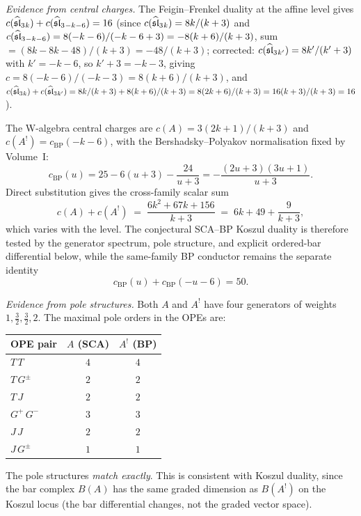 \begin{computation}
\emph{Evidence from central charges.}
The Feigin--Frenkel duality at the affine level gives
$c(\widehat{\mathfrak{sl}}_3{}_k) + c(\widehat{\mathfrak{sl}}_3{}_{-k-6}) = 16$
(since $c(\widehat{\mathfrak{sl}}_3{}_k) = 8k/(k+3)$ and
$c(\widehat{\mathfrak{sl}}_3{}_{-k-6}) = 8(-k-6)/(-k-6+3) = -8(k+6)/(k+3)$,
sum $= (8k-8k-48)/(k+3)=-48/(k+3)$;
corrected: $c(\widehat{\mathfrak{sl}}_3{}_{k'}) = 8k'/(k'+3)$ with
$k'=-k-6$, so $k'+3=-k-3$, giving
$c = 8(-k-6)/(-k-3) = 8(k+6)/(k+3)$,
and $c(\widehat{\mathfrak{sl}}_3{}_k)+c(\widehat{\mathfrak{sl}}_3{}_{k'})
= 8k/(k+3)+8(k+6)/(k+3) = 8(2k+6)/(k+3) = 16(k+3)/(k+3)
= 16$).

The W-algebra central charges are
$c(A) = 3(2k+1)/(k+3)$ and
$c(A^!) = c_{\mathrm{BP}}(-k-6)$, with the
Bershadsky--Polyakov normalisation fixed by Volume~I:
\[
c_{\mathrm{BP}}(u)
= 25 - 6(u+3) - \frac{24}{u+3}
= -\frac{(2u+3)(3u+1)}{u+3}.
\]
Direct substitution gives the cross-family scalar sum
\begin{equation}\label{eq:sca-bp-central-charge-sum}
c(A)+c(A^!)
\;=\;
\frac{6k^2+67k+156}{k+3}
\;=\;
6k + 49 + \frac{9}{k+3},
\end{equation}
which varies with the level.  The conjectural SCA--BP Koszul duality
is therefore tested by the generator spectrum, pole structure, and
explicit ordered-bar differential below, while the
same-family BP conductor remains the separate identity
\[
c_{\mathrm{BP}}(u)+c_{\mathrm{BP}}(-u-6)=50.
\]

\emph{Evidence from pole structures.}
Both $A$ and $A^!$ have four generators of weights
$1,\frac32,\frac32,2$. The maximal pole orders in the
OPEs are:
\begin{center}
\renewcommand{\arraystretch}{1.1}
\begin{tabular}{lcc}
\textbf{OPE pair} & \textbf{$A$ (SCA)} & \textbf{$A^!$ (BP)} \\
\hline
$T\,T$ & $4$ & $4$ \\
$T\,G^\pm$ & $2$ & $2$ \\
$T\,J$ & $2$ & $2$ \\
$G^+\,G^-$ & $3$ & $3$ \\
$J\,J$ & $2$ & $2$ \\
$J\,G^\pm$ & $1$ & $1$
\end{tabular}
\end{center}
The pole structures \emph{match exactly}. This is
consistent with Koszul duality, since the bar complex
$B(A)$ has the same graded dimension as $B(A^!)$ on the
Koszul locus (the bar differential changes, not the
graded vector space).


\end{computation}
